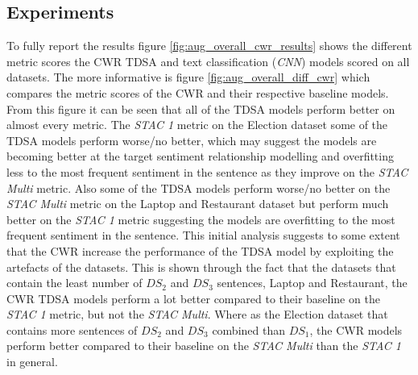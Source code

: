 \subsection{Experiments}
To fully report the results figure \ref{fig:aug_overall_cwr_results} shows the different metric scores the CWR TDSA and text classification (\textit{CNN}) models scored on all datasets. The more informative is figure \ref{fig:aug_overall_diff_cwr} which compares the metric scores of the CWR and their respective baseline models. From this figure it can be seen that all of the TDSA models perform better on almost every metric. The \textit{STAC 1} metric on the Election dataset some of the TDSA models perform worse/no better, which may suggest the models are becoming better at the target sentiment relationship modelling and overfitting less to the most frequent sentiment in the sentence as they improve on the \textit{STAC Multi} metric. Also some of the TDSA models perform worse/no better on the \textit{STAC Multi} metric on the Laptop and Restaurant dataset but perform much better on the \textit{STAC 1} metric suggesting the models are overfitting to the most frequent sentiment in the sentence. This initial analysis suggests to some extent that the CWR increase the performance of the TDSA model by exploiting the artefacts of the datasets. This is shown through the fact that the datasets that contain the least number of $DS_2$ and $DS_3$ sentences, Laptop and Restaurant, the CWR TDSA models perform a lot better compared to their baseline on the \textit{STAC 1} metric, but not the \textit{STAC Multi}. Where as the Election dataset that contains more sentences of $DS_2$ and $DS_3$ combined than $DS_1$, the CWR models perform better compared to their baseline on the \textit{STAC Multi} than the \textit{STAC 1} in general. 

